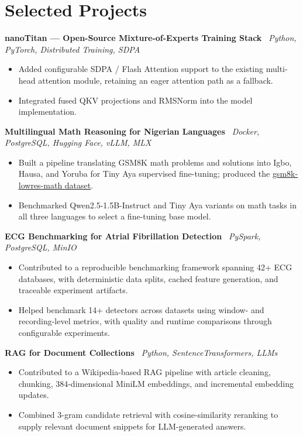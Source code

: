 \documentclass[11pt]{article}
\newcommand{\project}[2]{\textbf{#1} {\small\textit{\textbar\ #2}}\par}
\begin{document}
\section{Selected Projects}
\project{nanoTitan --- Open-Source Mixture-of-Experts Training Stack}{Python, PyTorch, Distributed Training, SDPA}
\begin{itemize}
    \item Added configurable SDPA / Flash Attention support to the existing multi-head attention module, retaining an eager attention path as a fallback.
    \item Integrated fused QKV projections and RMSNorm into the model implementation.
\end{itemize}
\vspace{3pt}
\project{Multilingual Math Reasoning for Nigerian Languages}{Docker, PostgreSQL, Hugging Face, vLLM, MLX}
\begin{itemize}
    \item Built a pipeline translating GSM8K math problems and solutions into Igbo, Hausa, and Yoruba for Tiny Aya supervised fine-tuning; produced the \href{https://huggingface.co/datasets/dayveedd/gsm8k-lowres-math}{\underline{gsm8k-lowres-math dataset}}.
    \item Benchmarked Qwen2.5-1.5B-Instruct and Tiny Aya variants on math tasks in all three languages to select a fine-tuning base model.
\end{itemize}
\vspace{3pt}
\project{ECG Benchmarking for Atrial Fibrillation Detection}{PySpark, PostgreSQL, MinIO}
\begin{itemize}
    \item Contributed to a reproducible benchmarking framework spanning 42+ ECG databases, with deterministic data splits, cached feature generation, and traceable experiment artifacts.
    \item Helped benchmark 14+ detectors across datasets using window- and recording-level metrics, with quality and runtime comparisons through configurable experiments.
\end{itemize}

\vspace{3pt}
\project{RAG for Document Collections}{Python, SentenceTransformers, LLMs}
\begin{itemize}
    \item Contributed to a Wikipedia-based RAG pipeline with article cleaning, chunking, 384-dimensional MiniLM embeddings, and incremental embedding updates.
    \item Combined 3-gram candidate retrieval with cosine-similarity reranking to supply relevant document snippets for LLM-generated answers.
\end{itemize}
\end{document}
